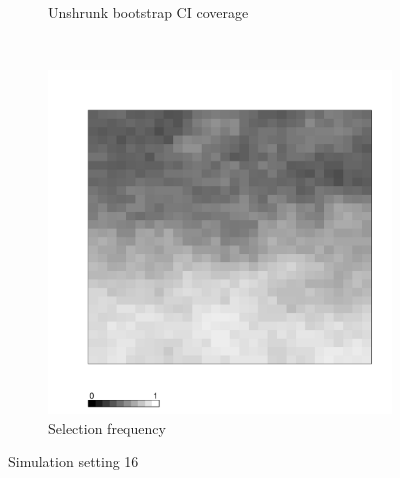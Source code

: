\documentclass[authoryear, review, 11pt]{elsarticle}
\begin{document}
\begin{figure}
\begin{subfigure}[b]{0.45\textwidth}
		\caption{Unshrunk bootstrap CI coverage}
	\end{subfigure}%
	~ %
	\begin{subfigure}[b]{0.45\textwidth}
	\centering
		\includegraphics[width=\textwidth]{../../figures/simulation/X1.15.16.selection.pdf}
		\caption{Selection frequency}
	\end{subfigure}
	\caption{Simulation setting 16}
\end{figure}
\end{document}
